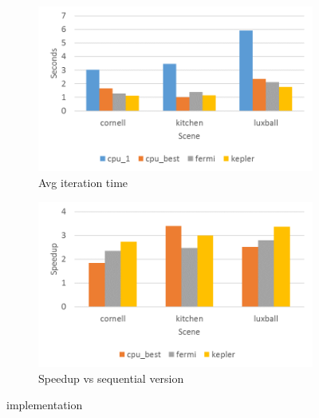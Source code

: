 \documentclass[main.tex]{subfiles}
\begin{document}
\begin{figure}[!htp]
  \centering
  \begin{subfigure}{.5\textwidth}
    \centering
    \includegraphics[width=\linewidth]{profiling/gpu_time}
    \caption{Avg iteration time \label{fig:prof:cuda_time}}
  \end{subfigure}%
  \begin{subfigure}{.5\textwidth}
    \centering
    \includegraphics[width=\linewidth]{profiling/gpu_speedup}
    \caption{Speedup vs sequential version \label{fig:prof:cuda_speedup}}
  \end{subfigure}
  \caption{\cuda implementation \label{fig:prof:cuda}}
\end{figure}
\end{document}
